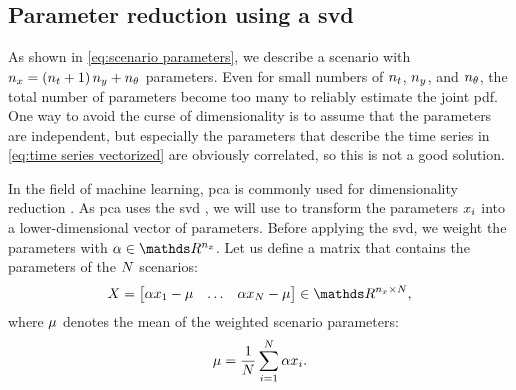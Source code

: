 \subsection{Parameter reduction using a \acl{svd}}
\label{sec:svd}

As shown in \cref{eq:scenario parameters}, we describe a scenario with $n_x = \left( n_t + 1 \right) n_y + n_\theta$ parameters.
Even for small numbers of $n_t$, $n_y$, and $n_\theta$, the total number of parameters become too many to reliably estimate the joint \ac{pdf}.
One way to avoid the curse of dimensionality is to assume that the parameters are independent, but especially the parameters that describe the time series in \cref{eq:time series vectorized} are obviously correlated, so this is not a good solution.

In the field of machine learning, \ac{pca} is commonly used for dimensionality reduction \autocite{abdi2010principal}.
As \ac{pca} uses the \ac{svd} \autocite{golub2013matrix}, we will use  to transform the parameters $x_{i}$ into a lower-dimensional vector of parameters.
Before applying the \ac{svd}, we weight the parameters with $\weights \in \realnumbers^{\dimensionscenariopars}$.
Let us define a matrix that contains the parameters of the $N$ scenarios:
\begin{equation}
	\scenarioparsmatrix = \begin{bmatrix}
		\weights\scenariopars_1-\svdmean & \ldots & \weights\scenariopars_{\scenariosnumberof}-\svdmean
	\end{bmatrix} \in \realnumbers^{\dimensionscenariopars \times \scenariosnumberof},
\end{equation}
where $\mu$ denotes the mean of the weighted scenario parameters:
\begin{equation}
	\mu = \frac{1}{N} \sum_{i=1}^{N} \alpha x_{i}.
\end{equation}

